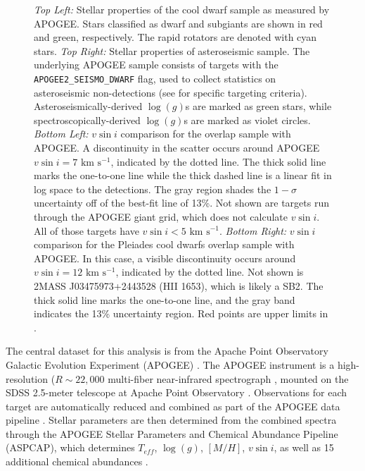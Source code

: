 \documentclass[manuscript]{aastex6}
\newcommand{\vsini}{\ensuremath{v \sin i}}
\newcommand{\Teff}{\ensuremath{T_{eff}}}
\newcommand{\logg}{\ensuremath{\log(g)}}
\newcommand{\kms}{\textrm{ km~s}\ensuremath{^{-1}}}
\newcommand{\APOGEESEISMO}{\texttt{APOGEE2\_SEISMO\_DWARF}}
\begin{document}
\begin{figure}
    \caption{\emph{Top Left:} Stellar properties of the cool dwarf sample as
        measured by APOGEE\@. Stars classified as dwarf and subgiants are shown in 
        red and green, respectively. The rapid rotators are denoted with cyan 
        stars.
        \emph{Top Right:} Stellar properties of asteroseismic sample. The 
        underlying APOGEE sample consists of targets with the 
        \APOGEESEISMO{} flag, used to collect statistics on 
        asteroseismic non-detections (see \citet{Zasowski17} for specific 
        targeting criteria). Asteroseismically-derived \logg{}s are marked 
        as green stars, while spectroscopically-derived \logg{}s are marked as 
        violet circles.
        \emph{Bottom Left:} \vsini{} comparison for the \citet{Bruntt12} overlap 
        sample with APOGEE\@. A discontinuity in the
        scatter occurs around APOGEE \(\vsini=7 \kms\), indicated by the dotted
        line. The thick solid line 
        marks the one-to-one line while the thick dashed line is a linear fit in 
        log space to the detections. The gray region shades the \(1-\sigma\)
        uncertainty off of the best-fit line of 13\%. Not shown are targets 
        run through the APOGEE giant grid, which does not calculate \vsini. 
        All of those targets have \citet{Bruntt12} \(\vsini < 5 \kms\). 
        \emph{Bottom Right:} 
        \vsini{} comparison for the Pleiades cool dwarfs \citep{Stauffer87} 
        overlap sample with APOGEE\@. In this case, a visible discontinuity 
        occurs around \(\vsini=12\kms\), indicated by the dotted line. Not 
        shown is 2MASS J03475973+2443528 (HII 1653), which 
        is likely a SB2. The thick solid line marks the one-to-one line, and
        the gray band indicates the 13\% uncertainty region.
        Red points are upper limits in \citet{Stauffer87}.\label{fig:sample}}
\end{figure}

The central dataset for this analysis is from the Apache Point Observatory 
Galactic Evolution Experiment (APOGEE) \citep{Blanton17,Majewski17}. The
APOGEE instrument is a high-resolution (\(R \sim 22,000\) multi-fiber 
near-infrared spectrograph \citep{Wilson10}, mounted on the SDSS 2.5-meter 
telescope at Apache Point Observatory \citep{Gunn06}. Observations for each
target are automatically reduced and combined as part of the APOGEE data 
pipeline \citep{Nidever15}. Stellar parameters are then determined from the 
combined spectra through the APOGEE Stellar Parameters and Chemical Abundance 
Pipeline (ASPCAP), which determines \Teff{}, \logg{}, \([M/H]\), \vsini{}, as 
well as 15 additional chemical abundances \citep{GarciaPerez16}.
\end{document}
